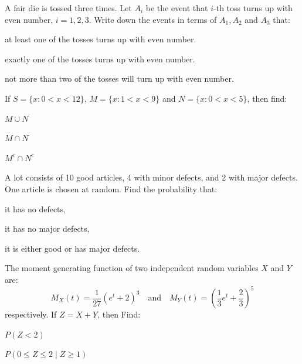 \documentclass[11pt,a4paper]{article}
\begin{document}
\begin{parts}
  \item A fair die is tossed three times. Let $A_i$ be the event that $i$-th toss turns up with even number, $i = 1, 2, 3$. Write down the events in terms of $A_1, A_2$ and $A_3$ that:
  
\begin{parts}
    \item at least one of the tosses turns up with even number.
    \item exactly one of the tosses turns up with even number.
    \item not more than two of the tosses will turn up with even number.
  \end{parts}

  \item If $S = \{x : 0 < x < 12\}$, $M = \{x : 1 < x < 9\}$ and $N = \{x : 0 < x < 5\}$, then find:
  
\begin{parts}
    \item $M \cup N$
    \item $M \cap N$
    \item $M^c \cap N^c$
  \end{parts}

  \item A lot consists of 10 good articles, 4 with minor defects, and 2 with major defects. One article is chosen at random. Find the probability that:
  
\begin{parts}
    \item it has no defects,
    \item it has no major defects,
    \item it is either good or has major defects.
  \end{parts}

  \item The moment generating function of two independent random variables $X$ and $Y$ are:
  \[ M_X(t) = \frac{1}{27}(e^t + 2)^3 \quad  \text{and} \quad M_Y(t) = \left(\frac{1}{3}e^t + \frac{2}{3}\right)^5 \]
  respectively. If $Z = X + Y$, then Find:
  
\begin{parts}
    \item $P(Z < 2)$
    \item $P(0 \le Z \le 2 \mid Z \ge 1)$
  \end{parts}
\end{parts}
\end{document}
